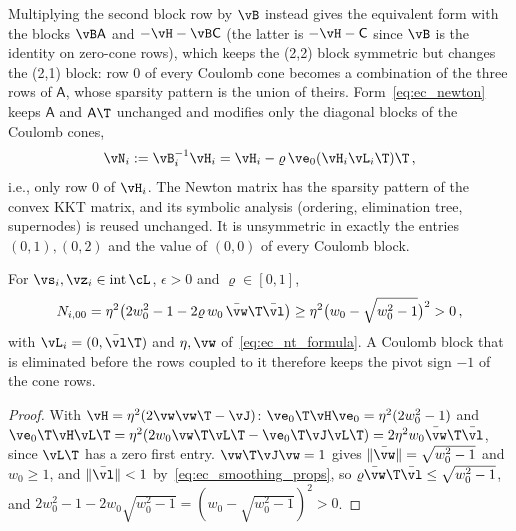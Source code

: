 %
Multiplying the second block row by $\vB$ instead gives the equivalent form with the blocks $\vB\mathsf{A}$ and $-\vH - \vB\mathsf{C}$ (the latter is $-\vH - \mathsf{C}$ since $\vB$ is the identity on zero-cone rows), which keeps the (2,2) block symmetric but changes the (2,1) block: row $0$ of every Coulomb cone becomes a combination of the three rows of $\mathsf{A}$, whose sparsity pattern is the union of theirs. Form~\eqref{eq:ec_newton} keeps $\mathsf{A}$ and $\mathsf{A}\T$ unchanged and modifies only the diagonal blocks of the Coulomb cones,
%
\begin{equation}\label{eq:ec_N}
	\vN_i := \vB_i^{-1}\vH_i = \vH_i - \varrho\,\ve_0(\vH_i\vL_i\T)\T \, ,
\end{equation}
%
i.e., only row $0$ of $\vH_i$. The Newton matrix has the sparsity pattern of the convex KKT matrix, and its symbolic analysis (ordering, elimination tree, supernodes) is reused unchanged. It is unsymmetric in exactly the entries $(0, 1), (0, 2)$ and the value of $(0, 0)$ of every Coulomb block.
%
\begin{proposition}\label{prop:ec_N00}
	For $\vs_i, \vz_i \in \operatorname{int}\cL$, $\epsilon > 0$ and $\varrho \in [0, 1]$,
	\begin{equation}
		N_{i,00} = \eta^2\big(2w_0^2 - 1 - 2\varrho\,w_0\,\bar{\vw}\T\bar{\vl}\big) \geq \eta^2\big(w_0 - \sqrt{w_0^2 - 1}\big)^2 > 0 \, ,
	\end{equation}
	with $\vL_i = (0, \bar{\vl}\T)$ and $\eta, \vw$ of~\eqref{eq:ec_nt_formula}. A Coulomb block that is eliminated before the rows coupled to it therefore keeps the pivot sign $-1$ of the cone rows.
\end{proposition}
%
\begin{proof}
	With $\vH = \eta^2(2\vw\vw\T - \vJ)$: $\ve_0\T\vH\ve_0 = \eta^2(2w_0^2 - 1)$ and $\ve_0\T\vH\vL\T = \eta^2(2w_0\vw\T\vL\T - \ve_0\T\vJ\vL\T) = 2\eta^2 w_0\bar{\vw}\T\bar{\vl}$, since $\vL\T$ has a zero first entry. $\vw\T\vJ\vw = 1$ gives $\|\bar{\vw}\| = \sqrt{w_0^2 - 1}$ and $w_0 \geq 1$, and $\|\bar{\vl}\| < 1$ by~\eqref{eq:ec_smoothing_props}, so $\varrho\bar{\vw}\T\bar{\vl} \leq \sqrt{w_0^2 - 1}$, and $2w_0^2 - 1 - 2w_0\sqrt{w_0^2 - 1} = (w_0 - \sqrt{w_0^2 - 1})^2 > 0$.
\end{proof}
%
